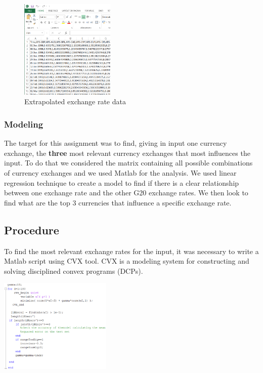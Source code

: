 \begin{figure}[!h]
	\begin{center}
		\includegraphics[width=0.4\textwidth]{bbb.png}
		\caption{Extrapolated exchange rate data}
		\label{extrap_ex_data}
	\end{center}
\end{figure}

\subsubsection{Modeling}
The target for this assignment was to find, giving in input one currency exchange, the \textbf{three} most relevant currency exchanges that most influences the input. To do that we considered the matrix containing all possible combinations of currency exchanges and we used Matlab for the analysis. We used linear regression technique to create a model to find if there is a clear relationship between one exchange rate and the other G20 exchange rates. We then look to find what are the top 3 currencies that influence a specific exchange rate.

\subsection{Procedure}
To find the most relevant exchange rates for the input, it was necessary to write a Matlab script using CVX tool. CVX is a modeling system for constructing and solving disciplined convex programs (DCPs)\cite{leung2000forecasting}. 

\includegraphics[width=0.4\textwidth]{ccc.png}

